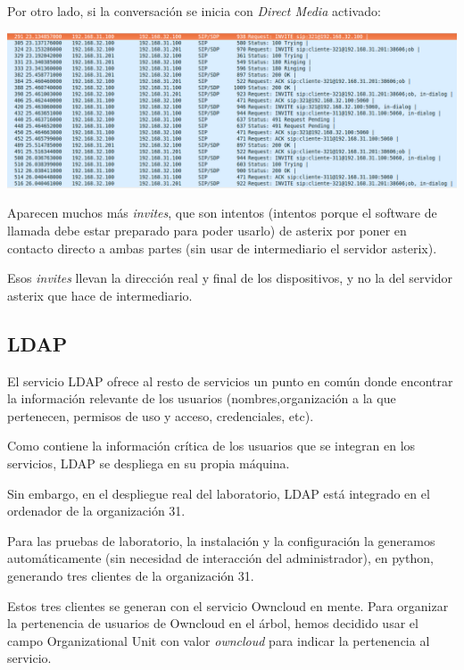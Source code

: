 \documentclass[]{article}
\begin{document}
Por otro lado, si la conversación se inicia con \textit{Direct Media} activado:

\begin{center}
	\includegraphics[width=1\linewidth]{images/voip11}
\end{center}

Aparecen muchos más \textit{invites}, que son intentos (intentos porque el software de llamada debe estar preparado para poder usarlo) de asterix por poner en contacto directo a ambas partes (sin usar de intermediario el servidor asterix).

Esos \textit{invites} llevan la dirección real y final de los dispositivos, y no la del servidor asterix que hace de intermediario.

\subsection{LDAP}
El servicio LDAP ofrece al resto de servicios un punto en común donde encontrar la información relevante de los usuarios (nombres,organización a la que pertenecen, permisos de uso y acceso, credenciales, etc).


Como contiene la información crítica de los usuarios que se integran en los servicios, LDAP se despliega en su propia máquina.

Sin embargo, en el despliegue real del laboratorio, LDAP está integrado en el ordenador de la organización 31.

Para las pruebas de laboratorio, la instalación y la configuración la generamos automáticamente (sin necesidad de interacción del administrador), en python, generando tres clientes de la organización 31.

Estos tres clientes se generan con el servicio Owncloud en mente. Para organizar la pertenencia de usuarios de Owncloud en el árbol, hemos decidido usar el campo Organizational Unit con valor \textit{owncloud} para indicar la pertenencia al servicio.
                                                                                                                                                                                                                                                                    
\end{document}
